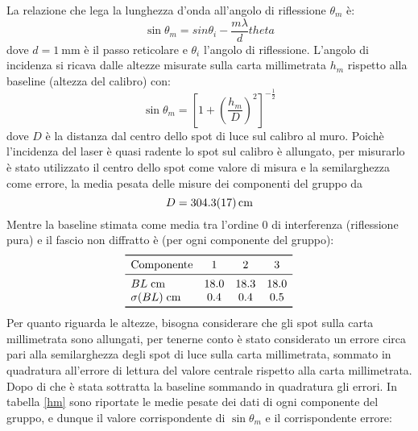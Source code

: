 \documentclass[10pt, a4paper, italian]{article}
\begin{document}
La relazione che lega la lunghezza d'onda all'angolo di riflessione $\theta_m$ è:
\[
{\sin{\theta_m}=sin{\theta_i}-\frac{m\lambda}{d}}{theta}
\]
dove $d=\SI{1}{\milli \meter}$ è il passo reticolare e $\theta_i$ l'angolo di riflessione. L'angolo di incidenza si ricava dalle altezze misurate sulla carta millimetrata $h_m$ rispetto alla baseline (altezza del calibro) con:
\[
{\sin{\theta_m}=\left[ 1+\left(\frac{h_m}{D}\right)^2\right]^{-\frac{1}{2}}}
\]
dove $D$ è la distanza dal centro dello spot di luce sul calibro al muro. Poichè l'incidenza del laser è quasi radente lo spot sul calibro è allungato, per misurarlo è stato utilizzato il centro dello spot come valore di misura e la semilarghezza come errore, la media pesata delle misure dei componenti del gruppo da 
\[
{D= \SI{304.3 \pm 1.7}{\centi \meter}}
\]
Mentre la baseline stimata come media tra l'ordine 0 di interferenza (riflessione pura) e il fascio non diffratto è (per ogni componente del gruppo):
\[
\begin{array}{lccc}
\toprule
\mathrm{Componente} & 1& 2 &3 \\
\midrule
BL \; \si{\centi \meter}&18.0 & 18.3 &18.0 \\
\sigma(BL)\; \si{\centi \meter}& 0.4&  0.4 & 0.5\\
\bottomrule
\end{array}
\]
Per quanto riguarda le altezze, bisogna considerare che gli spot sulla carta millimetrata sono allungati, per tenerne conto è stato considerato un errore circa pari alla semilarghezza degli spot di luce sulla carta millimetrata, sommato in quadratura all'errore di lettura del valore centrale rispetto alla carta millimetrata. Dopo di che è stata sottratta la baseline sommando in quadratura gli errori. \newline
In tabella \ref{hm} sono riportate le medie pesate dei dati di ogni componente del gruppo, e dunque il valore corrispondente di $\sin{\theta_m}$ e il corrispondente errore:
\end{document}
